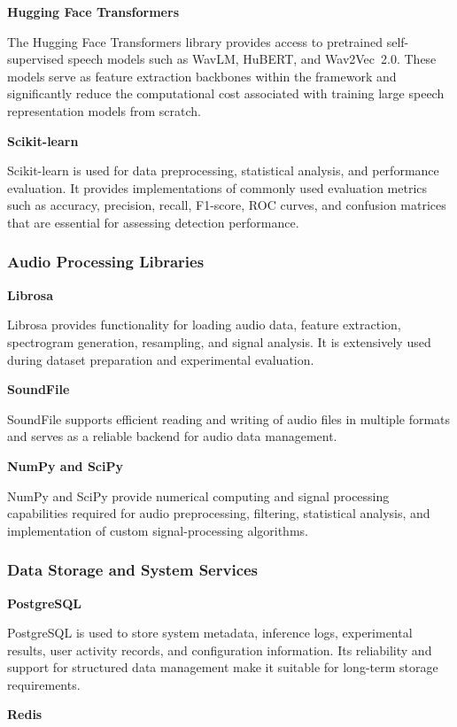 \textbf{Hugging Face Transformers}

The Hugging Face Transformers library provides access to pretrained self-supervised speech models such as WavLM, HuBERT, and Wav2Vec~2.0. These models serve as feature extraction backbones within the framework and significantly reduce the computational cost associated with training large speech representation models from scratch.

\textbf{Scikit-learn}

Scikit-learn is used for data preprocessing, statistical analysis, and performance evaluation. It provides implementations of commonly used evaluation metrics such as accuracy, precision, recall, F1-score, ROC curves, and confusion matrices that are essential for assessing detection performance.


\subsubsection{Audio Processing Libraries}
\vspace{0.5cm}
\textbf{Librosa}

Librosa provides functionality for loading audio data, feature extraction, spectrogram generation, resampling, and signal analysis. It is extensively used during dataset preparation and experimental evaluation.

\textbf{SoundFile}

SoundFile supports efficient reading and writing of audio files in multiple formats and serves as a reliable backend for audio data management.

\textbf{NumPy and SciPy}

NumPy and SciPy provide numerical computing and signal processing capabilities required for audio preprocessing, filtering, statistical analysis, and implementation of custom signal-processing algorithms.


\subsubsection{Data Storage and System Services}
\vspace{0.5cm}
\textbf{PostgreSQL}

PostgreSQL is used to store system metadata, inference logs, experimental results, user activity records, and configuration information. Its reliability and support for structured data management make it suitable for long-term storage requirements.

\textbf{Redis}

